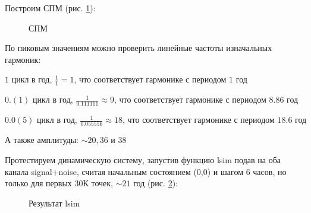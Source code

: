 \documentclass[a4paper,oneside,14pt]{extreport}
\begin{document}
Построим СПМ (рис. \ref{task3_psd}):
\begin{figure}[!h]
	\caption{СПМ}
	\label{task3_psd}
\end{figure}

\noindent По пиковым значениям можно проверить линейные частоты изначальных гармоник: 

\noindent $1 \text{ цикл в год, } \frac{1}{1} = 1 \text{, что соответствует гармонике с периодом 1 год}$

\noindent $0.(1) \text{ цикл в год, } \frac{1}{0.111111} \approx 9\text{, что соответствует гармонике с периодом 8.86 год}$

\noindent $0.0(5) \text{ цикл в год, } \frac{1}{0.055556} \approx 18\text{, что соответствует гармонике с периодом 18.6 год}$

\noindent А также амплитуды: $\sim 20, 36$ и $38$

\newpage

Протестируем динамическую систему, запустив функцию lsim подав на оба канала signal+noise, считая начальным состоянием (0,0) и шагом 6 часов, но только для первых 30К точек, $\sim 21$ год (рис. \ref{task3_lsim}):

\begin{figure}[!h]
	\caption{Результат lsim}
	\label{task3_lsim}
\end{figure}
\end{document}
